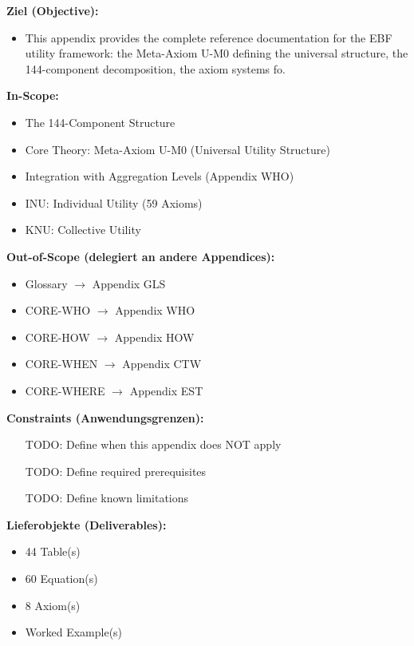 \begin{tcolorbox}[
    colback=orange!5!white,
    colframe=orange!75!black,
    title={\textbf{Appendix Scope: Ziel / In-Scope / Out-of-Scope / Constraints}},
    fonttitle=\bfseries
]

\textbf{Ziel (Objective):}
\begin{itemize}[nosep]
    \item This appendix provides the complete reference documentation for the EBF 
utility framework: the Meta-Axiom U-M0 defining the universal structure, 
the 144-component decomposition, the axiom systems fo.
\end{itemize}

\textbf{In-Scope:}
\begin{itemize}[nosep]
    \item The 144-Component Structure
    \item Core Theory: Meta-Axiom U-M0 (Universal Utility Structure)
    \item Integration with Aggregation Levels (Appendix WHO)
    \item INU: Individual Utility (59 Axioms)
    \item KNU: Collective Utility
\end{itemize}

\textbf{Out-of-Scope (delegiert an andere Appendices):}
\begin{itemize}[nosep]
    \item Glossary $\rightarrow$ Appendix GLS
    \item CORE-WHO $\rightarrow$ Appendix WHO
    \item CORE-HOW $\rightarrow$ Appendix HOW
    \item CORE-WHEN $\rightarrow$ Appendix CTW
    \item CORE-WHERE $\rightarrow$ Appendix EST
\end{itemize}

\textbf{Constraints (Anwendungsgrenzen):}
\begin{itemize}[nosep]
    \item [TODO: Define when this appendix does NOT apply]
    \item [TODO: Define required prerequisites]
    \item [TODO: Define known limitations]
\end{itemize}

\textbf{Lieferobjekte (Deliverables):}
\begin{itemize}[nosep]
    \item 44 Table(s)
    \item 60 Equation(s)
    \item 8 Axiom(s)
    \item Worked Example(s)
\end{itemize}

\end{tcolorbox}


